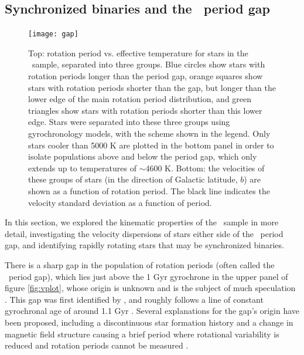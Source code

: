 \subsection{Synchronized binaries and the \kepler\ period gap}
\label{sec:gap}

\begin{figure}
  \caption{
      Top: rotation period vs. effective temperature for stars in the \mct\
    sample, separated into three groups. Blue circles
      show stars with rotation periods longer than the
    period gap, orange squares show stars with rotation periods shorter than
    the gap, but longer than the lower edge of the main rotation period
    distribution, and green triangles show stars with rotation periods shorter
    than this lower edge.
    Stars were separated into these three groups using \citet{angus2019}
    gyrochronology models, with the scheme shown in the legend.
    Only stars cooler than 5000 K are plotted in
    the bottom panel in order to isolate populations above and below the
    period gap, which only extends up to temperatures of $\sim$4600 K.
    Bottom: the velocities of these groups of stars (in the direction of
    Galactic latitude, $b$) are shown as a function of rotation period.
    The black line indicates the velocity standard deviation as a function of
    period.
}
  \centering
    \texttt{[image: gap]}
\label{fig:gap}
\end{figure}

In this section, we explored the kinematic properties of the \mct\ sample in
more detail, investigating the velocity dispersions of stars either side of the
\kepler\ period gap, and identifying rapidly rotating stars that may be
synchronized binaries.

There is a sharp gap in the population of rotation periods (often called the
\kepler\ period gap), which lies just above the 1 Gyr gyrochrone in the upper
panel of figure \ref{fig:vplot}, whose origin is unknown and is the subject of
much speculation \citep{mcquillan2014, davenport2018, reinhold2019}.
This gap was first identified by \mct, and roughly follows a line of constant
gyrochronal age of around 1.1 Gyr \citep[according to the][gyrochronology
relation]{angus2019}.
Several explanations for the gap's origin have been proposed, including a
discontinuous star formation history \citep{mcquillan2013, davenport2017,
davenport2018} and a change in magnetic field structure causing a brief period
where rotational variability is reduced and rotation periods cannot be
measured \citep{reinhold2019}.

